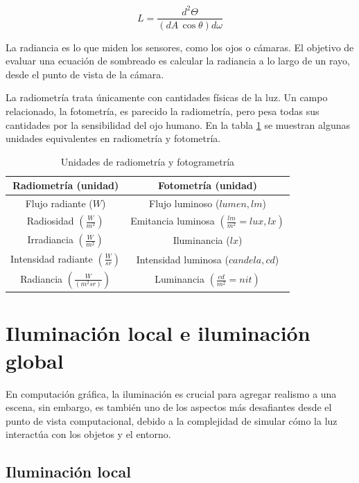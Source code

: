 $$
L = \frac{d^2\Theta}{(dA\,\cos\theta)d\omega}
$$

La radiancia es lo que miden los sensores, como los ojos o cámaras.
El objetivo de evaluar una ecuación de sombreado es calcular la radiancia a lo largo de un rayo, desde el punto de vista de la cámara.

La radiometría trata únicamente con cantidades físicas de la luz.
Un campo relacionado, la fotometría, es parecido la radiometría, pero pesa todas sus cantidades por la sensibilidad del ojo humano.
En la tabla \ref{table:light_units} se muestran algunas unidades equivalentes en radiometría y fotometría.

\begin{table}
\centering
\begin{tabular}{|c|c|}
    \hline
    \textbf{Radiometría (unidad)} & \textbf{Fotometría (unidad)} \\
    \hline
    Flujo radiante ($W$) & Flujo luminoso ($lumen, lm$) \\
    Radiosidad $\left(\frac{W}{m^2}\right)$ & Emitancia luminosa $\left(\frac{lm}{m^2} = lux, lx\right)$ \\
    Irradiancia $\left(\frac{W}{m^2}\right)$ & Iluminancia ($lx$) \\
    Intensidad radiante $\left(\frac{W}{sr}\right)$ & Intensidad luminosa ($candela, cd$) \\
    Radiancia $\left(\frac{W}{(m^2sr)}\right)$ & Luminancia $\left(\frac{cd}{m^2} = nit\right)$ \\
    \hline
\end{tabular}
\caption{Unidades de radiometría y fotogrametría}
\label{table:light_units}
\end{table}

\section{Iluminación local e iluminación global}\label{sec:local_vs_global}

En computación gráfica, la iluminación es crucial para agregar realismo a una escena, sin embargo, es también uno de los aspectos más desafiantes desde el punto de vista computacional, debido a la complejidad de simular cómo la luz interactúa con los objetos y el entorno.

\subsection{Iluminación local}

